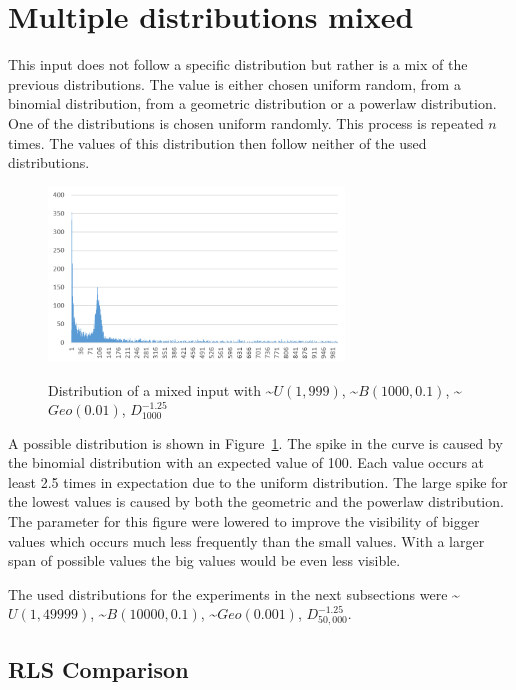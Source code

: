 \section{Multiple distributions mixed}
This input does not follow a specific distribution but rather is a mix of the previous distributions.
The value is either chosen uniform random, from a binomial distribution, from a geometric distribution  or a powerlaw distribution.
One of the distributions is chosen uniform randomly.
This process is repeated $n$ times.
The values of this distribution then follow neither of the used distributions.

\begin{figure}[h]
      \caption{Distribution of a mixed input with \textasciitilde$U(1,999)$, \textasciitilde$B(1000,0.1)$, \textasciitilde$Geo(0.01)$, $D^{-1.25}_{1000}$}
      \centering
      \includegraphics[width=0.7\textwidth]{figures/images/numberGenerator/mixed.png}\label{fig:mixedDistExample}
\end{figure}

A possible distribution is shown in Figure~\ref{fig:mixedDistExample}.
The spike in the curve is caused by the binomial distribution with an expected value of 100.
Each value occurs at least 2.5 times in expectation due to the uniform distribution.
The large spike for the lowest values is caused by both the geometric and the powerlaw distribution.
The parameter for this figure were lowered to improve the visibility of bigger values which occurs much less frequently than the small values.
With a larger span of possible values the big values would be even less visible.

The used distributions for the experiments in the next subsections were \textasciitilde$U(1,49999)$, \textasciitilde$B(10000,0.1)$, \textasciitilde$Geo(0.001)$, $D^{-1.25}_{50,000}$.
\subsection{RLS Comparison}


